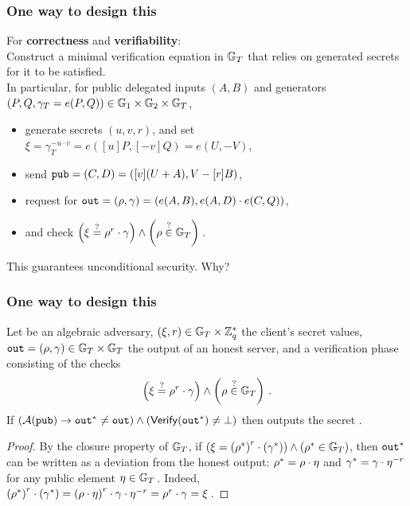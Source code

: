 \documentclass{beamer}
\begin{document}
\begin{frame}
    \frametitle{One way to design this}
    \small
    \pause
    For \textbf{correctness} and \textbf{verifiability}: 
    \\
    \vspace{1em}
    \pause Construct a minimal verification equation in $\mathbb{G}_T$ that relies on \client generated secrets for it to be satisfied. 
    \pause
    \\
    \vspace{1em}
    In particular, for public delegated inputs $(A,B)$ and generators $(P,Q,\gamma_T=e(P,Q))\in\mathbb{G}_1\times\mathbb{G}_2\times\mathbb{G}_T$, 
    \begin{itemize}
        \setlength{\itemsep}{7.5pt}
        \pause
        \item generate secrets $(u,v,r)$, and set $\xi=\gamma_T^{-u\cdot v}=e([u]P,[-v]Q)=e(U,-V)$,
        \pause
        \item send ${\tt pub}=(C,D)=([v](U+A),V-[r]B)$,
        \pause
        \item request for ${\tt out}=(\rho,\gamma)=(e(A,B),e(A,D)\cdot e(C,Q))$,
        \pause
        \item and check $\left(\xi\overset{?}{=}\rho^{r}\cdot\gamma\right)\wedge\left(\rho\overset{?}{\in}\mathbb{G}_T\right)\,$.
    \end{itemize}
    \pause
    This guarantees unconditional security. Why?
\end{frame}

\begin{frame}
    \frametitle{One way to design this}
    \small
\begin{lemma}\label{lemma:sec-against-forgery}  
	Let \adversary be an algebraic adversary, $\left(\xi,r\right)\in\mathbb{G}_T\times\mathbb {Z}_q^*$ the client's secret values, ${\tt out}=(\rho,\gamma)
	\in\mathbb{G}_T\times\mathbb{G}_T$ the output of an honest server, and \verify a verification phase consisting of the checks
	\begin{equation}
        \left(\xi\overset{?}{=}\rho^{r}\cdot\gamma\right)\wedge\left(\rho\overset{?}{\in}\mathbb{G}_T\right)\,.\label{eq:verif-eq}
    \end{equation}
    If $\left(\mathcal{A}({\tt pub})\to{\ensuremath{{\tt out}}}^*\neq{\tt out}\right)\wedge\left({\sf Verify}({{\tt out}}^*)\neq\bot\right)$ then \adversary outputs the secret \secexp.
\end{lemma}
\pause
\begin{proof}
    By the closure property of $\mathbb{G}_T$,
    if $\left(\xi=\left({\rho}^*\right)^{r}\cdot\left({\gamma}^*\right)\right)\wedge\left({\rho}^*\in\mathbb{G}_T\right)$, then ${{\tt out}}^*$ can be written as a deviation from the honest output: ${\rho}^*=\rho\cdot\eta$ and ${\gamma}^*=\gamma\cdot\eta^{-r}$ for any public element $\eta\in\mathbb{G}_T\,$. Indeed,  
    $\left({\rho}^*\right)^{r}\cdot\left({\gamma}^*\right)
    =
    \left(\rho\cdot\eta\right)^r\cdot\gamma\cdot\eta^{-r}=\rho^r\cdot\gamma=\xi\,$.
\end{proof}
\end{frame}
\end{document}
